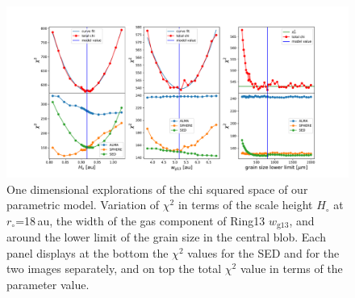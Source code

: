 \documentclass[fleqn,usenatbib,useAMS]{mnras}
\begin{document}
\begin{figure}
	\includegraphics[width=\textwidth]{plot_chi_squared_all800.pdf}
        \caption{One dimensional explorations of the chi squared space of our parametric model. Variation of $\chi^2$ in terms of the scale height $H_\circ$ at $r_\circ$=18\,au, the width of the gas component of Ring13 $w_{\mathrm{g13}}$, and around the lower limit of the grain size in the central blob. Each panel displays at the bottom the $\chi^2$ values for the SED and for the two images separately, and on top the total $\chi^2$ value in terms of the parameter value.}
    \label{fig:chi}
\end{figure}




\bsp	%
\label{lastpage}
\end{document}
